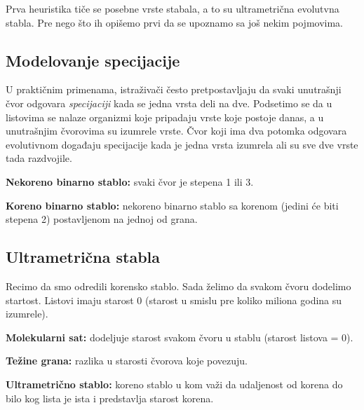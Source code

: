 Prva heuristika tiče se posebne vrste stabala, a to su ultrametrična evolutvna stabla. Pre nego što ih opišemo prvi da se upoznamo sa još nekim pojmovima.


\subsection{Modelovanje specijacije}
\label{subsec:ms}

U prakti\v{c}nim primenama, istra\v{z}iva\v{c}i \v{c}esto pretpostavljaju da svaki unutra\v{s}nji \v{c}vor odgovara \textit{specijaciji} kada se jedna vrsta deli na dve. Podsetimo se da u listovima se nalaze organizmi koje pripadaju vrste koje postoje danas, a u unutrašnjim čvorovima su izumrele vrste. Čvor koji ima dva potomka odgovara evolutivnom događaju specijacije kada je jedna vrsta izumrela ali su sve dve vrste tada razdvojile.

\begin{definicija}
\textbf{Nekoreno binarno stablo:} svaki \v{c}vor je stepena 1 ili 3.
\end{definicija}

\begin{definicija}
\textbf{Koreno binarno stablo:} nekoreno binarno stablo sa korenom (jedini će biti stepena 2) postavljenom na jednoj od grana.
\end{definicija}

\subsection{Ultrametri\v{c}na stabla}
\label{subsec:us}

Recimo da smo odredili korensko stablo. Sada želimo da svakom čvoru dodelimo startost. Listovi imaju starost 0 (starost u smislu pre koliko miliona godina su izumrele).


\begin{definicija}
\textbf{Molekularni sat:} dodeljuje starost svakom \v{c}voru u stablu (starost listova = 0).
\end{definicija}

\begin{definicija}
\textbf{Te\v{z}ine grana:} razlika u starosti \v{c}vorova koje povezuju.
\end{definicija}

\begin{definicija}
\textbf{Ultrametri\v{c}no stablo:} koreno stablo u kom važi da udaljenost od korena do bilo kog lista je ista i predstavlja starost korena.
\end{definicija}

